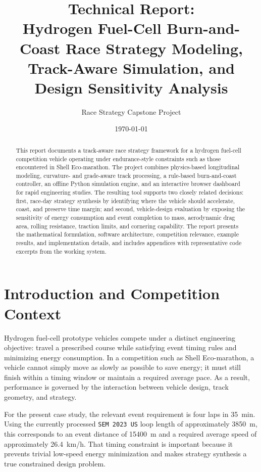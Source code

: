 \documentclass[11pt]{article}
\title{\textbf{Technical Report:}\\
Hydrogen Fuel-Cell Burn-and-Coast Race Strategy Modeling,\\
Track-Aware Simulation, and Design Sensitivity Analysis}
\author{Race Strategy Capstone Project}
\date{\today}
\begin{document}
\maketitle

\begin{abstract}
This report documents a track-aware race strategy framework for a hydrogen fuel-cell competition vehicle operating under endurance-style constraints such as those encountered in Shell Eco-marathon. The project combines physics-based longitudinal modeling, curvature- and grade-aware track processing, a rule-based burn-and-coast controller, an offline Python simulation engine, and an interactive browser dashboard for rapid engineering studies. The resulting tool supports two closely related decisions: first, race-day strategy synthesis by identifying where the vehicle should accelerate, coast, and preserve time margin; and second, vehicle-design evaluation by exposing the sensitivity of energy consumption and event completion to mass, aerodynamic drag area, rolling resistance, traction limits, and cornering capability. The report presents the mathematical formulation, software architecture, competition relevance, example results, and implementation details, and includes appendices with representative code excerpts from the working system.
\end{abstract}

\section{Introduction and Competition Context}

Hydrogen fuel-cell prototype vehicles compete under a distinct engineering objective: travel a prescribed course while satisfying event timing rules and minimizing energy consumption. In a competition such as Shell Eco-marathon, a vehicle cannot simply move as slowly as possible to save energy; it must still finish within a timing window or maintain a required average pace. As a result, performance is governed by the interaction between vehicle design, track geometry, and strategy.

For the present case study, the relevant event requirement is four laps in \SI{35}{min}. Using the currently processed \texttt{SEM 2023 US} loop length of approximately \SI{3850}{m}, this corresponds to an event distance of \SI{15400}{m} and a required average speed of approximately \SI{26.4}{km/h}. That timing constraint is important because it prevents trivial low-speed energy minimization and makes strategy synthesis a true constrained design problem.
\end{document}
